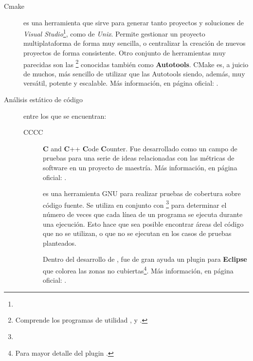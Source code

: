 \begin{description}
\item[Cmake] es una herramienta que sirve para generar tanto proyectos y soluciones de \textit{Visual Studio}\footnote{}, como  de \textit{Unix}. Permite gestionar un proyecto multiplataforma de forma muy sencilla, o centralizar la creación de nuevos proyectos de forma consistente. Otro conjunto de herramientas muy parecidas son las \footnote{Comprende los programas de utilidad ,  y .} conocidas también como \textbf{Autotools}. CMake es, a juicio de muchos, más sencillo de utilizar que las Autotools siendo, además, muy versátil, potente y escalable. Más información, en página oficial: .

\item [Análisis estático de código] entre los que se encuentran:

\begin{description}

\item [CCCC] \textbf{C} and \textbf{C}++ \textbf{C}ode \textbf{C}ounter. Fue desarrollado como un campo de pruebas para una serie de ideas relacionadas con las métricas de software en un proyecto de maestría. Más información, en página oficial: .

\item [] es una herramienta GNU para realizar pruebas de cobertura sobre código fuente. Se utiliza en conjunto con \footnote{} para determinar el número de veces que cada línea de un programa se ejecuta durante una ejecución. Esto hace que sea posible encontrar áreas del código que no se utilizan, o que no se ejecutan en los casos de pruebas planteados. 

Dentro del desarrollo de \maggen, fue de gran ayuda un plugin para \textbf{Eclipse} que colorea las zonas no cubiertas\footnote{Para mayor detalle del plugin .}. Más información, en página oficial: .

\end{description}

\end{description}
